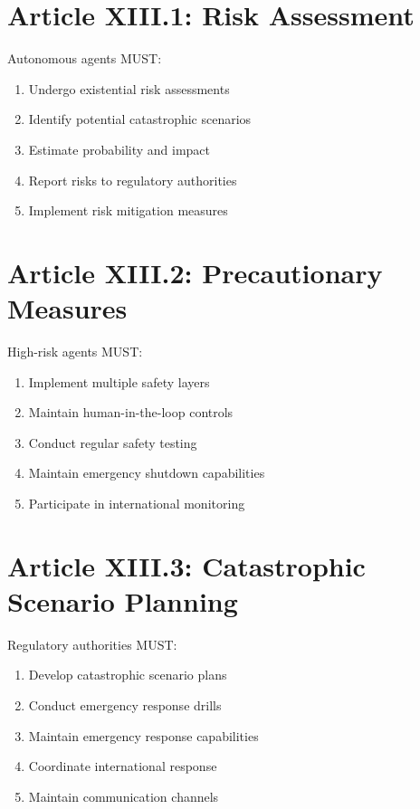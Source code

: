\section{Article XIII.1: Risk Assessment}

\begin{articlebox}
Autonomous agents MUST:
\begin{enumerate}
    \item Undergo existential risk assessments
    \item Identify potential catastrophic scenarios
    \item Estimate probability and impact
    \item Report risks to regulatory authorities
    \item Implement risk mitigation measures
\end{enumerate}
\end{articlebox}

\vspace{0.5cm}

\section{Article XIII.2: Precautionary Measures}

\begin{articlebox}
High-risk agents MUST:
\begin{enumerate}
    \item Implement multiple safety layers
    \item Maintain human-in-the-loop controls
    \item Conduct regular safety testing
    \item Maintain emergency shutdown capabilities
    \item Participate in international monitoring
\end{enumerate}
\end{articlebox}

\vspace{0.5cm}

\section{Article XIII.3: Catastrophic Scenario Planning}

\begin{articlebox}
Regulatory authorities MUST:
\begin{enumerate}
    \item Develop catastrophic scenario plans
    \item Conduct emergency response drills
    \item Maintain emergency response capabilities
    \item Coordinate international response
    \item Maintain communication channels
\end{enumerate}
\end{articlebox}

